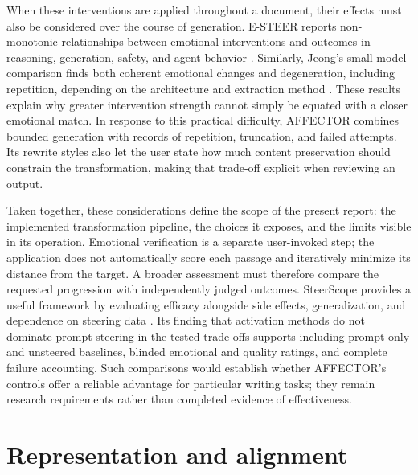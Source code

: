 \documentclass[manuscript,screen,nonacm]{acmart}
\begin{document}
When these interventions are applied throughout a document, their effects must also be considered over the course of generation. E-STEER reports non-monotonic relationships between emotional interventions and outcomes in reasoning, generation, safety, and agent behavior \cite{sun2026emotion}. Similarly, Jeong's small-model comparison finds both coherent emotional changes and degeneration, including repetition, depending on the architecture and extraction method \cite{jeong2026emotion}. These results explain why greater intervention strength cannot simply be equated with a closer emotional match. In response to this practical difficulty, AFFECTOR combines bounded generation with records of repetition, truncation, and failed attempts. Its rewrite styles also let the user state how much content preservation should constrain the transformation, making that trade-off explicit when reviewing an output.

Taken together, these considerations define the scope of the present report: the implemented transformation pipeline, the choices it exposes, and the limits visible in its operation. Emotional verification is a separate user-invoked step; the application does not automatically score each passage and iteratively minimize its distance from the target. A broader assessment must therefore compare the requested progression with independently judged outcomes. SteerScope provides a useful framework by evaluating efficacy alongside side effects, generalization, and dependence on steering data \cite{yang2026steerscope}. Its finding that activation methods do not dominate prompt steering in the tested trade-offs supports including prompt-only and unsteered baselines, blinded emotional and quality ratings, and complete failure accounting. Such comparisons would establish whether AFFECTOR's controls offer a reliable advantage for particular writing tasks; they remain research requirements rather than completed evidence of effectiveness.

\section{Representation and
alignment}\label{representation-and-alignment}
\end{document}
